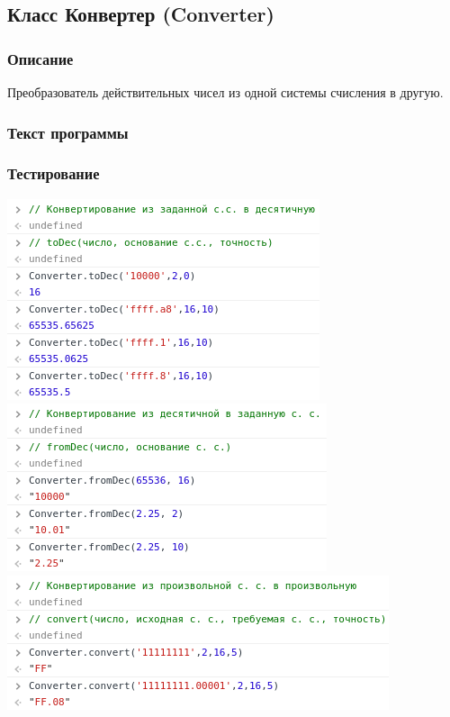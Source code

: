 \documentclass[oneside, final, 10pt]{extarticle}
\begin{document}
\subsection{Класс Конвертер (Converter)}

\subsubsection{Описание}

Преобразователь действительных чисел из одной системы счисления в другую.

\subsubsection{Текст программы}

\lstset{caption=converter.js}


\subsubsection{Тестирование}
\includegraphics{./screen/test_converter_todec}
\includegraphics{./screen/test_converter_fromdec}
\includegraphics{./screen/test_converter_convert}
\end{document}
